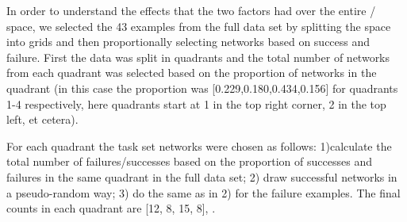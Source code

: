 In order to understand the effects that the two \famsec{} factors had over the entire \xQ{}/\xO{} space, we selected the 43 examples from the full data set by splitting the space into grids and then proportionally selecting networks based on success and failure. First the data was split in quadrants and the total number of networks from each quadrant was selected based on the proportion of networks in the quadrant (in this case the proportion was [0.229,0.180,0.434,0.156] for quadrants 1-4 respectively, here quadrants start at 1 in the top right corner, 2 in the top left, et cetera).

For each quadrant the task set networks were chosen as follows: 1)calculate the total number of failures/successes based on the proportion of successes and failures in the same quadrant in the full data set; 2) draw successful networks in a pseudo-random way; 3) do the same as in 2) for the failure examples. The final counts in each quadrant are [12, 8, 15, 8], .
